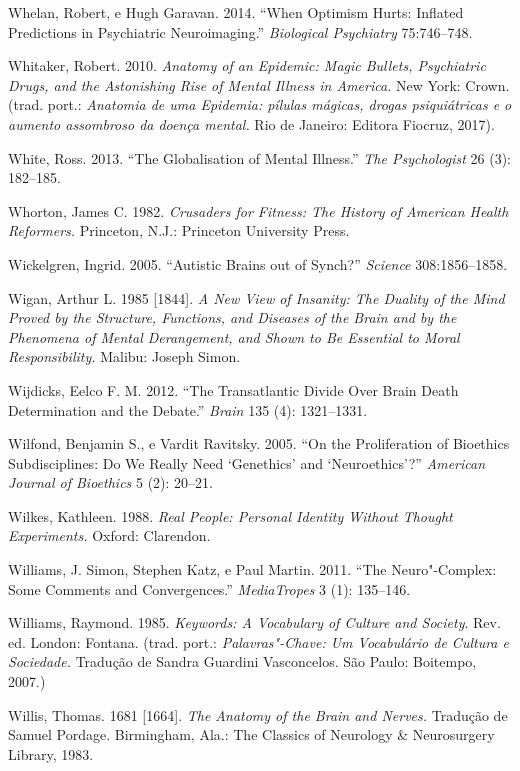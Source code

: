 {\begin{Parskip}
Whelan, Robert, e Hugh Garavan. 2014. ``When Optimism Hurts: Inflated
Predictions in Psychiatric Neuroimaging.'' \emph{Biological Psychiatry}
75:746--748.

Whitaker, Robert. 2010. \emph{Anatomy of an Epidemic: Magic Bullets,
Psychiatric Drugs, and the Astonishing Rise of Mental Illness in
America.} New York: Crown. (trad. port.: \emph{Anatomia de uma Epidemia:
pílulas mágicas, drogas psiquiátricas e o aumento assombroso da doença
mental.} Rio de Janeiro: Editora Fiocruz, 2017).

White, Ross. 2013. ``The Globalisation of Mental Illness.'' \emph{The
Psychologist} 26 (3): 182--185.

Whorton, James C. 1982. \emph{Crusaders for Fitness: The History of
American Health Reformers.} Princeton, N.J.: Princeton University Press.

Wickelgren, Ingrid. 2005. ``Autistic Brains out of Synch?''
\emph{Science} 308:1856--1858.

Wigan, Arthur L. 1985 {[}1844{]}. \emph{A New View of Insanity: The
Duality of the Mind Proved by the Structure, Functions, and Diseases of
the Brain and by the Phenomena of Mental Derangement, and Shown to Be
Essential to Moral Responsibility.} Malibu: Joseph Simon.

Wijdicks, Eelco F. M. 2012. ``The Transatlantic Divide Over Brain Death
Determination and the Debate.'' \emph{Brain} 135 (4): 1321--1331.

Wilfond, Benjamin S., e Vardit Ravitsky. 2005. ``On the Proliferation of
Bioethics Subdisciplines: Do We Really Need `Genethics' and
`Neuroethics'?'' \emph{American Journal of Bioethics} 5 (2): 20--21.

Wilkes, Kathleen. 1988. \emph{Real People: Personal Identity Without
Thought Experiments.} Oxford: Clarendon.

Williams, J. Simon, Stephen Katz, e Paul Martin. 2011. ``The
Neuro"-Complex: Some Comments and Convergences.'' \emph{MediaTropes} 3
(1): 135--146.

Williams, Raymond. 1985. \emph{Keywords: A Vocabulary of Culture and
Society}. Rev. ed. London: Fontana. (trad. port.: \emph{Palavras"-Chave:
Um Vocabulário de Cultura e Sociedade.} Tradução de Sandra Guardini
Vasconcelos. São Paulo: Boitempo, 2007.)

Willis, Thomas. 1681 {[}1664{]}. \emph{The Anatomy of the Brain and
Nerves.} Tradução de Samuel Pordage. Birmingham, Ala.: The Classics of
Neurology \& Neurosurgery Library, 1983.


\end{Parskip}}
